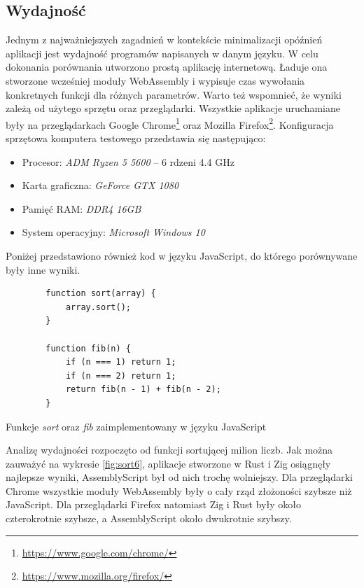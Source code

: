 \documentclass[language=polish,type=master]{aghmodern}
\begin{document}
\subsection{Wydajność}
Jednym z najważniejszych zagadnień w kontekście minimalizacji opóźnień aplikacji jest wydajność programów napisanych w danym języku.
W celu dokonania porównania utworzono prostą aplikację internetową.
Ładuje ona stworzone wcześniej moduły WebAssembly i wypisuje czas wywołania konkretnych funkcji dla różnych parametrów.
Warto też wspomnieć, że wyniki zależą od użytego sprzętu oraz przeglądarki.
Wszystkie aplikacje uruchamiane były na przeglądarkach Google Chrome\footnote{\url{https://www.google.com/chrome/}} oraz Mozilla Firefox\footnote{\url{https://www.mozilla.org/firefox/}}.
Konfiguracja sprzętowa komputera testowego przedstawia się następująco:
\begin{itemize}
    \itemsep0em
    \item Procesor: \emph{ADM Ryzen 5 5600} -- 6 rdzeni 4.4 GHz
    \item Karta graficzna: \emph{GeForce GTX 1080}
    \item Pamięć RAM: \emph{DDR4 16GB}
    \item System operacyjny: \emph{Microsoft Windows 10}
\end{itemize}

Poniżej przedstawiono również kod w języku JavaScript, do którego porównywane były inne wyniki.

\begin{listing}[H]
    \begin{verbatim}
        function sort(array) {
            array.sort();
        }

        function fib(n) {
            if (n === 1) return 1;
            if (n === 2) return 1;
            return fib(n - 1) + fib(n - 2); 
        }
    \end{verbatim}
    \caption{Funkcje \emph{sort} oraz \emph{fib} zaimplementowany w języku JavaScript}
\end{listing}

Analizę wydajności rozpoczęto od funkcji sortującej milion liczb.
Jak można zauważyć na wykresie \ref{fig:sort6}, aplikacje stworzone w Rust i Zig osiągnęły najlepsze wyniki, AssemblyScript był od nich trochę wolniejszy.
Dla przeglądarki Chrome wszystkie moduły WebAssembly były o cały rząd złożoności szybsze niż JavaScript.
Dla przeglądarki Firefox natomiast Zig i Rust były około czterokrotnie szybsze, a AssemblyScript około dwukrotnie szybszy.
\end{document}
